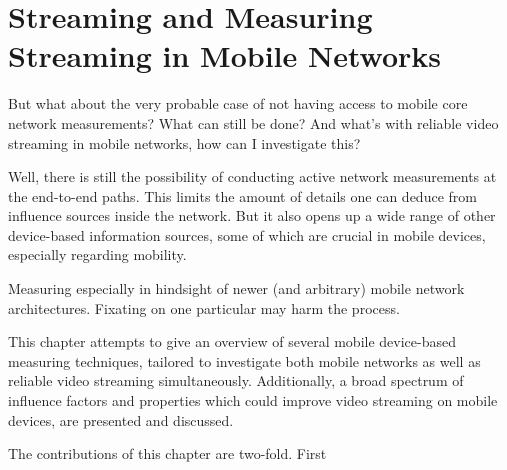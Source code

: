 \chapter{Streaming and Measuring Streaming in Mobile Networks}
\label{chap:mobilestreaming}

But what about the very probable case of not having access to mobile core network measurements? What can still be done? And what's with reliable video streaming in mobile networks, how can I investigate this?

Well, there is still the possibility of conducting active network measurements at the end-to-end paths. This limits the amount of details one can deduce from influence sources inside the network. But it also opens up a wide range of other device-based information sources, some of which are crucial in mobile devices, especially regarding mobility.

Measuring especially in hindsight of newer (and arbitrary) mobile network architectures. Fixating on one particular may harm the process.

This chapter attempts to give an overview of several mobile device-based measuring techniques, tailored to investigate both mobile networks as well as reliable video streaming simultaneously. Additionally, a broad spectrum of influence factors and properties which could improve video streaming on mobile devices, are presented and discussed.

The contributions of this chapter are two-fold. First










